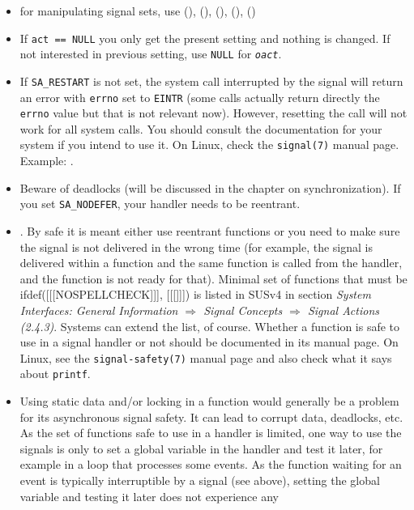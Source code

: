 \begin{itemize}
\item for manipulating signal sets, use (),
(), (), (),
()
\item If \texttt{act == NULL} you only get the present setting and nothing is
changed.  If not interested in previous setting, use \texttt{NULL} for
\emph{\texttt{oact}}.
\item If \texttt{SA\_RESTART} is not set, the system call interrupted by the
signal will return an error with \texttt{errno} set to \texttt{EINTR} (some
calls actually return directly the \texttt{errno} value but that is not relevant
now).  However, resetting the call will not work for all system calls.  You
should consult the documentation for your system if you intend to use it.
On Linux, check the \texttt{signal(7)} manual page.  Example:
.
\item Beware of deadlocks (will be discussed in the chapter on synchronization).
If you set \texttt{SA\_NODEFER}, your handler needs to be reentrant.
\item {} .  By safe it is meant either use reentrant functions or you need
to make sure the signal is not delivered in the wrong time (for example, the
signal is delivered within a function and the same function is called from the
handler, and the function is not ready for that).  Minimal set of functions
that must be ifdef([[[NOSPELLCHECK]]], [[[]]])
is listed in SUSv4 in section \emph{System Interfaces: General Information
$\Rightarrow$ Signal Concepts $\Rightarrow$ Signal Actions (2.4.3)}.  Systems
can extend the list, of course.  Whether a function is safe to use in a signal
handler or not should be documented in its manual page.  On Linux, see
the \texttt{signal-safety(7)} manual page and also check what it says about
\texttt{printf}.
\item Using static data and/or locking in a function would generally be a
problem for its asynchronous signal safety.  It can lead to corrupt data,
deadlocks, etc.  As the set of functions safe to use in a handler is limited,
one way to use the signals is only to set a global variable in the handler and
test it later, for example in a loop that processes some events.  As the
function waiting for an event is typically interruptible by a signal (see
above), setting the global variable and testing it later does not experience any

\end{itemize}
